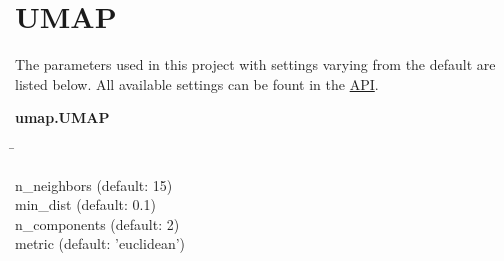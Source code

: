 \section{UMAP} \label{sec:UMAP}

\blindtext
\autocite{mcinnes_umap_2020}

The parameters used in this project with settings varying from the default are listed below. All available settings can be fount in the \href{https://umap-learn.readthedocs.io/en/latest/api.html}{API}.

\begin{leftbar}
    \textbf{umap.UMAP}
    \begin{nstabbing}
        \qquad\qquad\qquad\qquad\qquad\quad\=\kill

        n\_neighbors \> (default: 15)\\
        
        min\_dist \> (default: 0.1)\\
        
        n\_components \> (default: 2)\\
        
        metric \> (default: 'euclidean')
    \end{nstabbing}
\end{leftbar}

